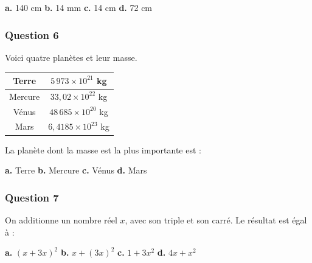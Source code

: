 \textbf{a.} 140 cm \hfill \textbf{b.} 14 mm \hfill \textbf{c.} 14 cm \hfill \textbf{d.} 72 cm

\subsubsection*{Question 6}
Voici quatre planètes et leur masse.

\begin{center}
\begin{tabular}{|c|c|}
\hline
Terre & $5\,973 \times 10^{21}$ kg \\
\hline
Mercure & $33,02 \times 10^{22}$ kg \\
\hline
Vénus & $48\,685 \times 10^{20}$ kg \\
\hline
Mars & $6,4185 \times 10^{23}$ kg \\
\hline
\end{tabular}
\end{center}

La planète dont la masse est la plus importante est :

\textbf{a.} Terre \hfill \textbf{b.} Mercure \hfill \textbf{c.} Vénus \hfill \textbf{d.} Mars

\subsubsection*{Question 7}
On additionne un nombre réel $x$, avec son triple et son carré. Le résultat est égal à :

\textbf{a.} $(x + 3x)^2$ \hfill \textbf{b.} $x + (3x)^2$ \hfill \textbf{c.} $1 + 3x^2$ \hfill \textbf{d.} $4x + x^2$

\bigskip

